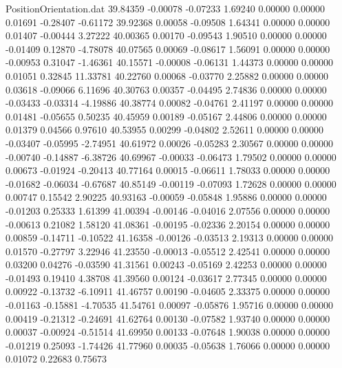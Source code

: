 \begin{filecontents}{PositionOrientation.dat}
  39.84359   -0.00078   -0.07233     1.69240    0.00000    0.00000    0.01691   -0.28407   -0.61172
  39.92368    0.00058   -0.09508     1.64341    0.00000    0.00000    0.01407   -0.00444    3.27222
  40.00365    0.00170   -0.09543     1.90510    0.00000    0.00000   -0.01409    0.12870   -4.78078
  40.07565    0.00069   -0.08617     1.56091    0.00000    0.00000   -0.00953    0.31047   -1.46361
  40.15571   -0.00008   -0.06131     1.44373    0.00000    0.00000    0.01051    0.32845   11.33781
  40.22760    0.00068   -0.03770     2.25882    0.00000    0.00000    0.03618   -0.09066    6.11696
  40.30763    0.00357   -0.04495     2.74836    0.00000    0.00000   -0.03433   -0.03314   -4.19886
  40.38774    0.00082   -0.04761     2.41197    0.00000    0.00000    0.01481   -0.05655    0.50235
  40.45959    0.00189   -0.05167     2.44806    0.00000    0.00000    0.01379    0.04566    0.97610
  40.53955    0.00299   -0.04802     2.52611    0.00000    0.00000   -0.03407   -0.05995   -2.74951
  40.61972    0.00026   -0.05283     2.30567    0.00000    0.00000   -0.00740   -0.14887   -6.38726
  40.69967   -0.00033   -0.06473     1.79502    0.00000    0.00000    0.00673   -0.01924   -0.20413
  40.77164    0.00015   -0.06611     1.78033    0.00000    0.00000   -0.01682   -0.06034   -0.67687
  40.85149   -0.00119   -0.07093     1.72628    0.00000    0.00000    0.00747    0.15542    2.90225
  40.93163   -0.00059   -0.05848     1.95886    0.00000    0.00000   -0.01203    0.25333    1.61399
  41.00394   -0.00146   -0.04016     2.07556    0.00000    0.00000   -0.00613    0.21082    1.58120
  41.08361   -0.00195   -0.02336     2.20154    0.00000    0.00000    0.00859   -0.14711   -0.10522
  41.16358   -0.00126   -0.03513     2.19313    0.00000    0.00000    0.01570   -0.27797    3.22946
  41.23550   -0.00013   -0.05512     2.42541    0.00000    0.00000    0.03200    0.04276   -0.03590
  41.31561    0.00243   -0.05169     2.42253    0.00000    0.00000   -0.01493    0.19410    4.38708
  41.39560    0.00124   -0.03617     2.77345    0.00000    0.00000    0.00922   -0.13732   -6.10911
  41.46757    0.00190   -0.04605     2.33375    0.00000    0.00000   -0.01163   -0.15881   -4.70535
  41.54761    0.00097   -0.05876     1.95716    0.00000    0.00000    0.00419   -0.21312   -0.24691
  41.62764    0.00130   -0.07582     1.93740    0.00000    0.00000    0.00037   -0.00924   -0.51514
  41.69950    0.00133   -0.07648     1.90038    0.00000    0.00000   -0.01219    0.25093   -1.74426
  41.77960    0.00035   -0.05638     1.76066    0.00000    0.00000    0.01072    0.22683    0.75673

\end{filecontents}
